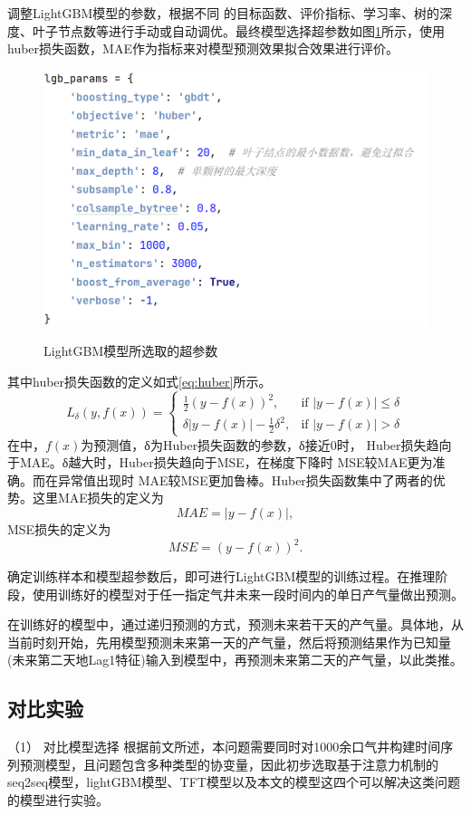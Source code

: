 调整LightGBM模型的参数，根据不同
的目标函数、评价指标、学习率、树的深度、叶子节点数等进行手动或自动调优。最终模型选择超参数如图\ref{fig:LightGBMSuper}所示，使用huber损失函数，MAE作为指标来对模型预测效果拟合效果进行评价。
\begin{figure}[H]
    \centering
    \caption{LightGBM模型所选取的超参数}
    \includegraphics{figure/LightGBMsuper.png}
    \label{fig:LightGBMSuper}
\end{figure}
其中huber损失函数的定义如式\eqref{eq:huber}所示。
\begin{equation}
    L_{\delta}(y, f(x)) = 
        \begin{cases} 
        \frac{1}{2}(y - f(x))^2, & \text{if } |y - f(x)| \leq \delta \\
        \delta|y - f(x)| - \frac{1}{2}\delta^2, & \text{if } |y - f(x)| > \delta
        \end{cases}
    \label{eq:huber}
\end{equation}
在中，\(f(x)\)为预测值，δ为Huber损失函数的参数，δ接近0时，
Huber损失趋向于MAE。δ越大时，Huber损失趋向于MSE，在梯度下降时 MSE较MAE更为准确。而在异常值出现时 MAE较MSE更加鲁棒。Huber损失函数集中了两者的优势。这里MAE损失的定义为
\[MAE = |y - f(x)|,\]
MSE损失的定义为
\[MSE = (y - f(x))^2.\]

确定训练样本和模型超参数后，即可进行LightGBM模型的训练过程。在推理阶段，使用训练好的模型对于任一指定气井未来一段时间内的单日产气量做出预测。

在训练好的模型中，通过递归预测的方式，预测未来若干天的产气量。具体地，从当前时刻开始，先用模型预测未来第一天的产气量，然后将预测结果作为已知量(未来第二天地Lag1特征)输入到模型中，再预测未来第二天的产气量，以此类推。
\subsection{对比实验}
（1） 对比模型选择
根据前文所述，本问题需要同时对1000余口气井构建时间序列预测模型，且问题包含多种类型的协变量，因此初步选取基于注意力机制的seq2seq模型，lightGBM模型、TFT模型以及本文的模型这四个可以解决这类问题的模型进行实验。


